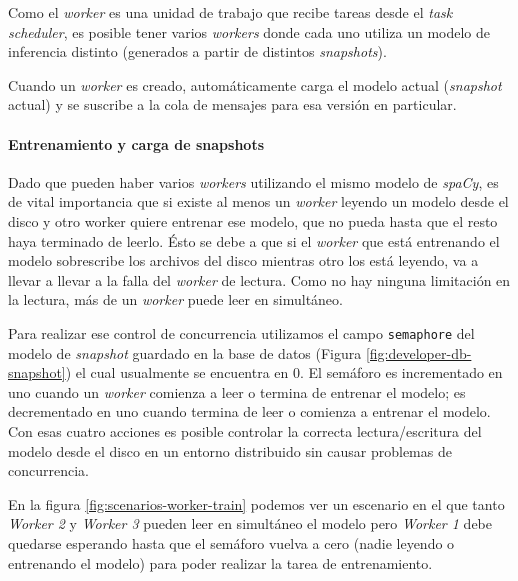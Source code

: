\documentclass[12pt,a4paper,]{scrartcl}
\let\oldparagraph\paragraph
\renewcommand{\paragraph}[1]{\oldparagraph{#1}\mbox{}}
\begin{document}
Como el \emph{worker} es una unidad de trabajo que recibe tareas desde el \emph{task scheduler}, es posible tener varios \emph{workers} donde cada uno utiliza un modelo de inferencia distinto (generados a partir de distintos \emph{snapshots}).

Cuando un \emph{worker} es creado, automáticamente carga el modelo actual (\emph{snapshot} actual) y se suscribe a la cola de mensajes para esa versión en particular.

\hypertarget{entrenamiento-y-carga-de-snapshots}{%
\paragraph{Entrenamiento y carga de snapshots}\label{entrenamiento-y-carga-de-snapshots}}

Dado que pueden haber varios \emph{workers} utilizando el mismo modelo de \emph{spaCy}, es de vital importancia que si existe al menos un \emph{worker} leyendo un modelo desde el disco y otro worker quiere entrenar ese modelo, que no pueda hasta que el resto haya terminado de leerlo.
Ésto se debe a que si el \emph{worker} que está entrenando el modelo sobrescribe los archivos del disco mientras otro los está leyendo, va a llevar a llevar a la falla del \emph{worker} de lectura. Como no hay ninguna limitación en la lectura, más de un \emph{worker} puede leer en simultáneo.

Para realizar ese control de concurrencia utilizamos el campo \texttt{semaphore} del modelo de \emph{snapshot} guardado en la base de datos (Figura \ref{fig:developer-db-snapshot}) el cual usualmente se encuentra en \(0\). El semáforo es incrementado en uno cuando un \emph{worker} comienza a leer o termina de entrenar el modelo; es decrementado en uno cuando termina de leer o comienza a entrenar el modelo. Con esas cuatro acciones es posible controlar la correcta lectura/escritura del modelo desde el disco en un entorno distribuido sin causar problemas de concurrencia.

En la figura \ref{fig:scenarios-worker-train} podemos ver un escenario en el que tanto \emph{Worker 2} y \emph{Worker 3} pueden leer en simultáneo el modelo pero \emph{Worker 1} debe quedarse esperando hasta que el semáforo vuelva a cero (nadie leyendo o entrenando el modelo) para poder realizar la tarea de entrenamiento.
\end{document}
